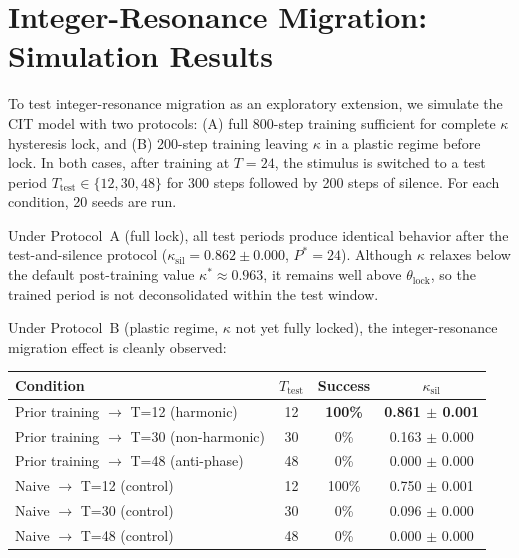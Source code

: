 \documentclass[12pt,a4paper]{article}
\begin{document}
\section{Integer-Resonance Migration: Simulation Results}
\label{sec:harmonic_migration}





To test integer-resonance migration as an exploratory extension, we simulate the CIT model with two protocols: (A) full 800-step training sufficient for complete $\kappa$ hysteresis lock, and (B) 200-step training leaving $\kappa$ in a plastic regime before lock. In both cases, after training at $T=24$, the stimulus is switched to a test period $T_{\mathrm{test}} \in \{12, 30, 48\}$ for 300 steps followed by 200 steps of silence. For each condition, 20 seeds are run.



Under Protocol~A (full lock), all test periods produce identical behavior after the test-and-silence protocol ($\kappa_{\mathrm{sil}} = 0.862 \pm 0.000$, $P^* = 24$). Although $\kappa$ relaxes below the default post-training value $\kappa^*\approx0.963$, it remains well above $\theta_{\mathrm{lock}}$, so the trained period is not deconsolidated within the test window.



Under Protocol~B (plastic regime, $\kappa$ not yet fully locked), the integer-resonance migration effect is cleanly observed:



\begin{center}

\begin{tabular}{lccc}

\toprule

Condition & $T_{\mathrm{test}}$ & Success & $\kappa_{\mathrm{sil}}$ \\

\midrule

Prior training $\rightarrow$ T=12 (harmonic) & 12 & \textbf{100\%} & \textbf{0.861 $\pm$ 0.001} \\

Prior training $\rightarrow$ T=30 (non-harmonic) & 30 & 0\% & 0.163 $\pm$ 0.000 \\

Prior training $\rightarrow$ T=48 (anti-phase) & 48 & 0\% & 0.000 $\pm$ 0.000 \\

Naive $\rightarrow$ T=12 (control) & 12 & 100\% & 0.750 $\pm$ 0.001 \\

Naive $\rightarrow$ T=30 (control) & 30 & 0\% & 0.096 $\pm$ 0.000 \\

Naive $\rightarrow$ T=48 (control) & 48 & 0\% & 0.000 $\pm$ 0.000 \\

\bottomrule

\end{tabular}

\end{center}
\end{document}
